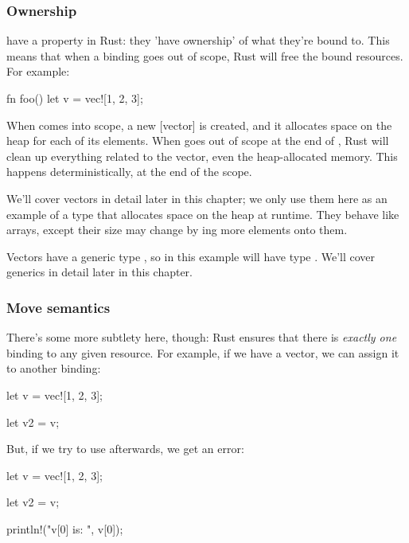 \subsubsection*{Ownership}

 have a property in Rust: they 'have ownership' of what they're bound to. This means that when 
a binding goes out of scope, Rust will free the bound resources. For example:

\begin{rustc}
fn foo() {
    let v = vec![1, 2, 3];
}
\end{rustc}

When  comes into scope, a new [vector] is created, and it allocates space on the heap for each of its elements. When 
goes out of scope at the end of , Rust will clean up everything related to the vector, even the heap-allocated memory. 
This happens deterministically, at the end of the scope.

\blank

We'll cover vectors in detail later in this chapter; we only use them here as an example of a type that allocates space on the 
heap at runtime. They behave like arrays, except their size may change by ing more elements onto them.

\blank

Vectors have a generic type , so in this example  will have type . We'll cover generics 
in detail later in this chapter.

\subsubsection*{Move semantics}

There's some more subtlety here, though: Rust ensures that there is \emph{exactly one} binding to any given resource. For 
example, if we have a vector, we can assign it to another binding:

\begin{rustc}
let v = vec![1, 2, 3];

let v2 = v;
\end{rustc}

But, if we try to use  afterwards, we get an error:

\begin{rustc}
let v = vec![1, 2, 3];

let v2 = v;

println!("v[0] is: {}", v[0]);
\end{rustc}

